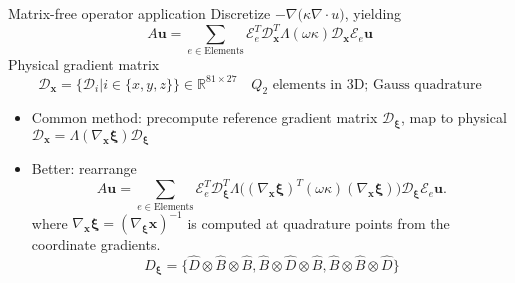 \documentclass{beamer}
\begin{document}
\begin{frame}{Matrix-free operator application}
  Discretize $-\nabla \Big(\kappa \nabla\cdot u\Big)$, yielding
  \begin{equation*}\label{eq:mf-scalar}
    A \mathbf u = \sum_{e \in \text{Elements}} \mathcal E_e^T \mathcal D_{\mathbf x}^T \Lambda(\omega \kappa) \mathcal D_{\mathbf x} \mathcal E_e \mathbf u
  \end{equation*}
  Physical gradient matrix
  $$\mathcal D_{\mathbf x} = \{\mathcal D_i | i \in \{x,y,z\} \} \in \mathbb R^{81\times 27} \quad \text{$Q_2$ elements in 3D; Gauss quadrature}$$
  \begin{itemize}
  \item Common method: precompute reference gradient matrix $\mathcal D_{\mathbf \xi}$, map to physical $\mathcal D_{\mathbf x} = \Lambda(\nabla_{\mathbf x}\mathbf\xi) \mathcal D_{\mathbf \xi}$
  \item Better: rearrange
  \begin{equation*}\label{eq:tensor}
    A \mathbf u = \sum_{e \in \text{Elements}} \mathcal E_e^T \mathcal D_{\mathbf \xi}^T \Lambda\Big((\nabla_{\mathbf x}\mathbf\xi)^T (\omega \kappa) (\nabla_{\mathbf x}\mathbf\xi) \Big) \mathcal D_{\mathbf \xi} \mathcal E_e \mathbf u .
  \end{equation*}
  where $\nabla_{\mathbf x}\mathbf\xi = (\nabla_{\mathbf\xi}\mathbf x)^{-1}$ is computed at quadrature points from the coordinate gradients.
  \begin{equation*}
    D_{\mathbf\xi} = \{\hat D \otimes \hat B \otimes \hat B, \hat B \otimes \hat D \otimes \hat B, \hat B \otimes \hat B \otimes \hat D \}
  \end{equation*}
  \end{itemize}
\end{frame}
\end{document}
